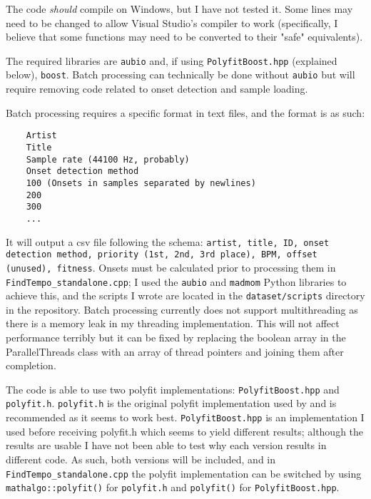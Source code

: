 \documentclass[11pt, oneside]{article}
\begin{document}
The code \emph{should} compile on Windows, but I have not tested it. Some lines
may need to be changed to allow Visual Studio's compiler to work (specifically,
I believe that some functions may need to be converted to their "safe"
equivalents).

The required libraries are \texttt{aubio} and, if using
\texttt{PolyfitBoost.hpp} (explained below), \texttt{boost}. Batch processing
can technically be done without \texttt{aubio} but will require removing code
related to onset detection and sample loading.

Batch processing requires a specific format in text files, and the format is
as such:
\begin{lstlisting}
    Artist
    Title
    Sample rate (44100 Hz, probably)
    Onset detection method
    100 (Onsets in samples separated by newlines)
    200
    300
    ...
\end{lstlisting}
It will output a csv file following the schema: \texttt{artist, title, ID, onset
detection method, priority (1st, 2nd, 3rd place), BPM, offset (unused),
fitness}. Onsets must be calculated prior to processing them in
\texttt{FindTempo\_standalone.cpp}; I used the \texttt{aubio} and
\texttt{madmom} Python libraries to achieve this, and the scripts I wrote are
located in the \texttt{dataset/scripts} directory in the repository. Batch
processing currently does not support multithreading as there is a memory leak
in my threading implementation. This will not affect performance terribly but it
can be fixed by replacing the boolean array in the ParallelThreads class with an
array of thread pointers and joining them after completion.

\begin{sloppypar}
    The code is able to use two polyfit implementations:
    \texttt{PolyfitBoost.hpp} and \texttt{polyfit.h}. \texttt{polyfit.h} is the
    original polyfit implementation used by \citeauthor*{bram} and is
    recommended as it seems to work best. \texttt{PolyfitBoost.hpp} is an
    implementation I used before receiving polyfit.h which seems to yield
    different results; although the results are usable I have not been able to
    test why each version results in different code. As such, both versions will
    be included, and in \texttt{FindTempo\_standalone.cpp} the polyfit
    implementation can be switched by using \texttt{mathalgo::polyfit()} for
    \texttt{polyfit.h} and \texttt{polyfit()} for \texttt{PolyfitBoost.hpp}.
\end{sloppypar}
\end{document}
